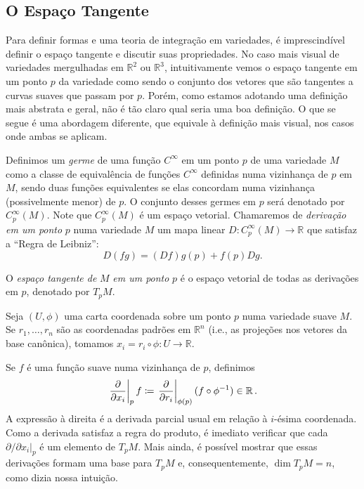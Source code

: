 \subsection{O Espaço Tangente}
\label{sec:O espaco Tangente}
Para definir formas e uma teoria de integração em variedades, é imprescindível definir o espaço tangente e discutir suas propriedades. No caso mais visual de variedades mergulhadas em $\mathbb R^2$ ou $\mathbb R^3$, intuitivamente vemos o espaço tangente em um ponto $p$ da variedade como sendo o conjunto dos vetores que são tangentes a curvas suaves que passam por $p$. Porém, como estamos adotando uma definição mais abstrata e geral, não é tão claro qual seria uma boa definição. O que se segue é uma abordagem diferente, que equivale à definição mais visual, nos casos onde ambas se aplicam.

Definimos um \textit{germe} de uma função $C^\infty$ em um ponto $p$ de uma variedade $M$ como a classe de equivalência de funções $C^{\infty}$ definidas numa vizinhança de $p$ em $M$, sendo duas funções equivalentes se elas concordam numa vizinhança (possivelmente menor) de $p$. O conjunto desses germes em $p$ será denotado por $C^{\infty}_p(M)$. Note que $C^{\infty}_p(M)$ é um espaço vetorial. Chamaremos de \textit{derivação em um ponto} $p$ numa variedade $M$ um mapa linear $D: C^{\infty}_p(M) \longrightarrow \mathbb R$ que satisfaz a ``Regra de Leibniz'':
\begin{equation*}
	D(fg) = (Df)g(p) + f(p)Dg.
\end{equation*}
\begin{definicao}
	O \textit{espaço tangente de} $M$ \textit{em um ponto} $p$ é o espaço vetorial de todas as derivações em $p$, denotado por $T_pM$. 
\end{definicao}

\begin{exemplo}
Seja $(U,\phi)$ uma carta coordenada sobre um ponto $p$ numa variedade suave $M$. Se $r_1,\ldots,r_n$ são as coordenadas padrões em $\mathbb R^n$ (i.e., as projeções nos vetores da base canônica), tomamos $x_i = r_i \circ \phi: U \longrightarrow \mathbb R$.

Se $f$ é uma função suave numa vizinhança de $p$, definimos
\[
\left.\frac{\partial}{\partial x_i}\right|_p f \coloneqq \left.\frac{\partial}{\partial r_i}\right|_{\phi(p)} (f \circ \phi^{-1}) \in \operatorname{\mathbb{R}}.
\]
A expressão à direita é a derivada parcial usual em relação à $i$-ésima coordenada. Como a derivada satisfaz a regra do produto, é imediato verificar que cada $\partial/\partial x_i|_p$ é um elemento de $T_pM$. Mais ainda, é possível mostrar que essas derivações formam uma base para $T_pM$ e, consequentemente, $\dim T_pM = n$, como dizia nossa intuição.
\end{exemplo} 

